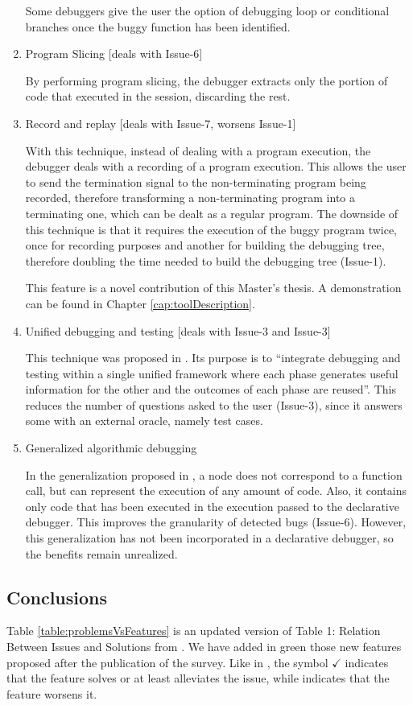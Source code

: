 \begin{enumerate}
Some debuggers give the user the option of debugging loop or conditional branches once the buggy function has been identified.
\item Program Slicing [deals with Issue-6]

By performing program slicing, the debugger extracts only the portion of code that executed in the session, discarding the rest.
\item Record and replay [deals with Issue-7, worsens Issue-1]

With this technique, instead of dealing with a program execution, the debugger deals with a recording of a program execution. This allows the user to send the termination signal to the non-terminating program being recorded, therefore transforming a non-terminating program into a terminating one, which can be dealt as a regular program. 
The downside of this technique is that it requires the execution of the buggy program twice, once for recording purposes and another for building the debugging tree, therefore doubling the time needed to build the debugging tree (Issue-1).

This feature is a novel contribution of this Master's thesis. A demonstration can be found in Chapter \ref{cap:toolDescription}.
\item Unified debugging and testing [deals with Issue-3 and Issue-3]

This technique was proposed in \cite{unifiedFrameworkDeclarativeDebuggingTesting}. Its purpose is to ``integrate debugging and testing within a single unified framework where each phase generates useful information for the other and the outcomes of each phase are reused''.
This reduces the number of questions asked to the user (Issue-3), since it answers some with an external oracle, namely test cases.
\item Generalized algorithmic debugging

In the generalization proposed in \cite{AlgorithmicDebuggingGeneralized}, a node does not correspond to a function call, but can represent the execution of any amount of code. Also, it contains only code that has been executed in the execution passed to the declarative debugger. This improves the granularity of detected bugs (Issue-6).
However, this generalization has not been incorporated in a declarative debugger, so the benefits remain unrealized.
\end{enumerate}
\subsection{Conclusions}
Table \ref{table:problemsVsFeatures} is an updated version of Table 1: Relation Between Issues and Solutions from \cite{Survey}. We have added in green those new features proposed after the publication of the survey. Like in \cite{Survey}, the symbol \(\checkmark\) indicates that the feature solves or at least alleviates the issue, while  indicates that the feature worsens it.

